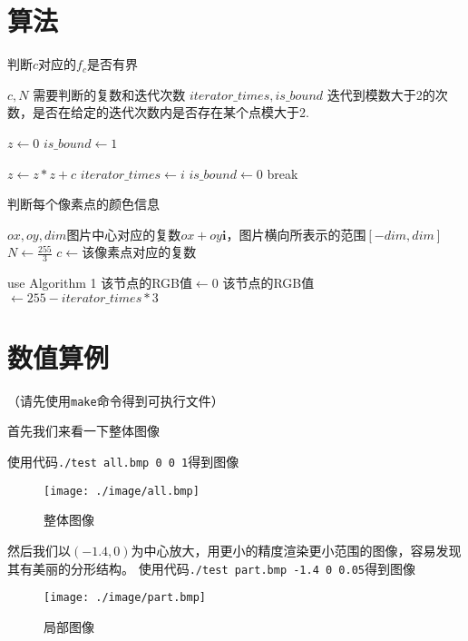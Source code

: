 \documentclass{article}
\begin{document}
\section{算法}
\begin{algorithm}  [H]
     \caption{判断$c$对应的$f_c$是否有界}  
     \begin{algorithmic}[1] %
         \Require   $c,N$ 需要判断的复数和迭代次数
         \Ensure   $iterator\_times,is\_bound$ 迭代到模数大于2的次数，是否在给定的迭代次数内是否存在某个点模大于2.
         
         \State $z \gets 0$
         \State $is\_bound \gets 1$
          
               \State $z \gets z*z+c$
                 \State $iterator\_times \gets i$
                 \State $is\_bound \gets 0$
                 \State break
               \EndIf
         \EndFor

     \end{algorithmic}  
 \end{algorithm}  
 \begin{algorithm}  [H]
     \caption{判断每个像素点的颜色信息}  
     \begin{algorithmic}[1] %
         \Require   $ox,oy,dim$图片中心对应的复数$ox+oy\textbf{i}$，图片横向所表示的范围$[-dim,dim]$ 
         \State $N\gets \frac{255}{3}$
               \State $c \gets $该像素点对应的复数
               
               \State use Algorithm 1
                    \State 该节点的RGB值$\gets 0$
               \Else
                    \State 该节点的RGB值$\gets 255-iterator\_times*3$
               \EndIf
         \EndFor

     \end{algorithmic}  
 \end{algorithm}  
\section{数值算例}
（请先使用\verb|make|命令得到可执行文件）

首先我们来看一下整体图像

使用代码\verb|./test all.bmp 0 0 1|得到图像
\begin{figure}[H]
     \centering
     \texttt{[image: ./image/all.bmp]}
     \caption{整体图像}
\end{figure}
然后我们以$(-1.4,0)$为中心放大，用更小的精度渲染更小范围的图像，容易发现其有美丽的分形结构。
使用代码\verb|./test part.bmp -1.4 0 0.05|得到图像
\begin{figure}[H]
     \centering
     \texttt{[image: ./image/part.bmp]}
     \caption{局部图像}
\end{figure}
\end{document}
